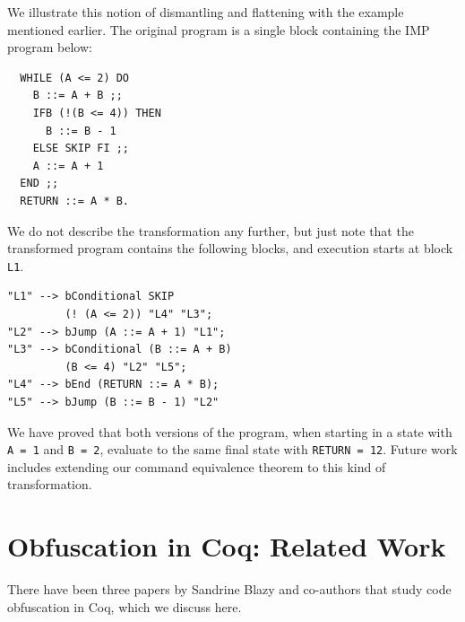 \documentclass[compsoc,conference,a4paper,10pt,times]{IEEEtran}
\begin{document}
We illustrate this notion of dismantling and flattening with the example mentioned earlier.  The original program is a single block containing the IMP program below:
\begin{verbatim}
  WHILE (A <= 2) DO
    B ::= A + B ;;
    IFB (!(B <= 4)) THEN
      B ::= B - 1
    ELSE SKIP FI ;;
    A ::= A + 1
  END ;;
  RETURN ::= A * B.
\end{verbatim}
We do not describe the transformation any further, but just note that the transformed program contains the following blocks, and execution starts at block \texttt{L1}.
\begin{verbatim}
"L1" --> bConditional SKIP
         (! (A <= 2)) "L4" "L3";
"L2" --> bJump (A ::= A + 1) "L1";
"L3" --> bConditional (B ::= A + B)
         (B <= 4) "L2" "L5";
"L4" --> bEnd (RETURN ::= A * B); 
"L5" --> bJump (B ::= B - 1) "L2"
\end{verbatim}
We have proved that both versions of the program, when starting in a state with \texttt{A = 1} and \texttt{B = 2}, evaluate to the same final state with \texttt{RETURN = 12}. Future work includes extending our command equivalence theorem to this kind of transformation.

\section{Obfuscation in Coq: Related Work}
There have been three papers by Sandrine Blazy and co-authors that study code obfuscation in Coq, which we discuss here.
\end{document}
